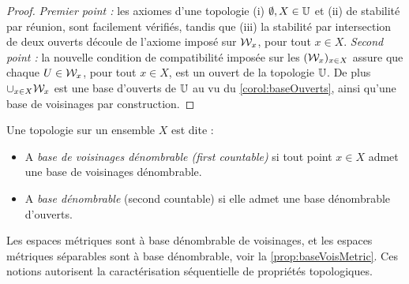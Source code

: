 \begin{proof}
	\emph{Premier point :} les axiomes d'une topologie (i) $\emptyset, X \in \mathbb{U}$ et (ii) de stabilité par réunion, sont facilement vérifiés, tandis que (iii) la stabilité par intersection de deux ouverts découle de l'axiome imposé sur $\mathcal{W}_x$, pour tout $x \in X$. \emph{Second point :} la nouvelle condition de compatibilité imposée sur les $(\mathcal{W}_x)_{x \in X}$ assure que chaque $U \in \mathcal{W}_x$, pour tout $x \in X$, est un ouvert de la topologie $\mathbb{U}$. De plus $\cup_{x \in X} \mathcal{W}_x$ est une base d'ouverts de $\mathbb{U}$ au vu du \ref{corol:baseOuverts}, ainsi qu'une base de voisinages par construction.
\end{proof}



\begin{definition}
\label{def:denVois}
%
	Une topologie sur un ensemble $X$ est dite : 
	\begin{itemize}
		\item A \emph{base de voisinages dénombrable (first countable)} si tout point $x\in X$ admet une base de voisinages dénombrable.
		\item A \emph{base dénombrable} (second countable) si elle admet une base dénombrable d'ouverts. 
	\end{itemize}
\end{definition}

Les espaces métriques sont à base dénombrable de voisinages, et les espaces métriques séparables sont à base dénombrable, voir la \cref{prop:baseVoisMetric}.
Ces notions autorisent la caractérisation séquentielle de propriétés topologiques. 


